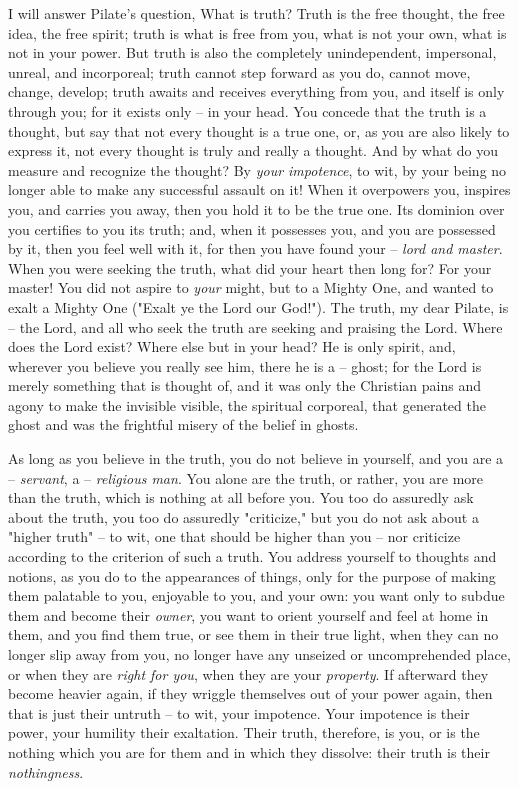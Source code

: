 \documentclass[a4paper]{book}
\begin{document}
I will answer Pilate's question, What is truth? Truth is the free thought, the 
free idea, the free spirit; truth is what is free from you, what is not your 
own, what is not in your power. But truth is also the completely 
unindependent, impersonal, unreal, and incorporeal; truth cannot step forward 
as you do, cannot move, change, develop; truth awaits and receives everything 
from you, and itself is only through you; for it exists only -- in your head. 
You concede that the truth is a thought, but say that not every thought is a 
true one, or, as you are also likely to express it, not every thought is truly 
and really a thought. And by what do you measure and recognize the thought? By 
\textit{your impotence}, to wit, by your being no longer able to make any 
successful assault on it! When it overpowers you, inspires you, and carries 
you away, then you hold it to be the true one. Its dominion over you certifies 
to you its truth; and, when it possesses you, and you are possessed by it, 
then you feel well with it, for then you have found your -- \textit{lord and 
master}. When you were seeking the truth, what did your heart then long for? 
For your master! You did not aspire to \textit{your} might, but to a Mighty 
One, and wanted to exalt a Mighty One ("{}Exalt ye the Lord our God!"{}). The 
truth, my dear Pilate, is -- the Lord, and all who seek the truth are seeking 
and praising the Lord. Where does the Lord exist? Where else but in your head? 
He is only spirit, and, wherever you believe you really see him, there he is a 
-- ghost; for the Lord is merely something that is thought of, and it was only 
the Christian pains and agony to make the invisible visible, the spiritual 
corporeal, that generated the ghost and was the frightful misery of the belief 
in ghosts.

As long as you believe in the truth, you do not believe in yourself, and you 
are a -- \textit{servant}, a -- \textit{religious man}. You alone are the 
truth, or rather, you are more than the truth, which is nothing at all before 
you. You too do assuredly ask about the truth, you too do assuredly 
"{}criticize,"{} but you do not ask about a "{}higher truth"{} -- to wit, one 
that should be higher than you -- nor criticize according to the criterion of 
such a truth. You address yourself to thoughts and notions, as you do to the 
appearances of things, only for the purpose of making them palatable to you, 
enjoyable to you, and your own: you want only to subdue them and become their 
\textit{owner}, you want to orient yourself and feel at home in them, and you 
find them true, or see them in their true light, when they can no longer slip 
away from you, no longer have any unseized or uncomprehended place, or when 
they are \textit{right for you}, when they are your \textit{property}. If 
afterward they become heavier again, if they wriggle themselves out of your 
power again, then that is just their untruth -- to wit, your impotence. Your 
impotence is their power, your humility their exaltation. Their truth, 
therefore, is you, or is the nothing which you are for them and in which they 
dissolve: their truth is their \textit{nothingness}.
\end{document}
